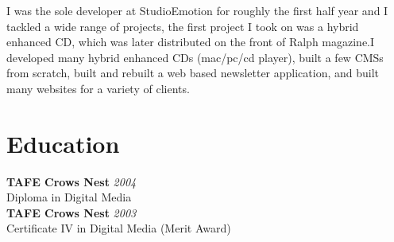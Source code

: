 \documentclass[a4paper,10pt]{article}
\begin{document}
I was the sole developer at StudioEmotion for roughly the first half year and I tackled a wide range of projects, the first project I took on was a hybrid enhanced CD, which was later distributed on the front of Ralph magazine.I developed many hybrid enhanced CDs (mac/pc/cd player), built a few CMSs from scratch, built and rebuilt a web based newsletter application, and built many websites for a variety of clients.

\section*{Education}

\textbf{TAFE Crows Nest} \hfill \textit{2004} \\
Diploma in Digital Media \\
\textbf{TAFE Crows Nest} \hfill \textit{2003} \\
Certificate IV in Digital Media (Merit Award)
\end{document}
